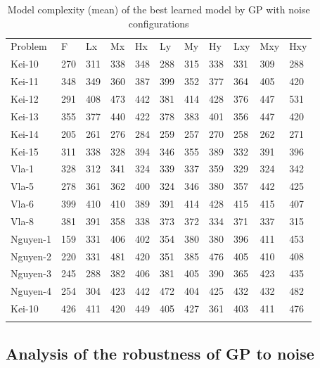 \begin{center}
\begin{table}
\caption{Model complexity (mean) of the best learned model by GP with noise configurations}
\label{tab:size}       %
\begin{tabular}{lllllllllll}
\hline\noalign{\smallskip}
Problem & F & Lx & Mx & Hx & Ly & My & Hy & Lxy & Mxy & Hxy  \\
\noalign{\smallskip}\hline\noalign{\smallskip}
Kei-10 & 270 & 311 & 338 & 348 & 288 & 315	& 338 &	331	& 309 & 288 \\
Kei-11 & 348 & 349 & 360 & 387 & 399 & 352 & 377 & 364 & 405 & 420 \\
Kei-12 & 291 & 408 & 473 & 442 & 381 & 414 & 428 & 376 & 447 & 531 \\
Kei-13 & 355 & 377 & 440 & 422 & 378 & 383 & 401 & 356 & 447 & 420 \\
Kei-14 & 205 & 261 & 276 & 284 & 259 & 257 & 270 & 258 & 262 & 271 \\
Kei-15 & 311 & 338 & 328 & 394 & 346 & 355 & 389 & 332 & 391 & 396 \\
Vla-1 & 328 & 312 & 341 & 324 & 339 & 337 & 359 & 329 & 324 & 342 \\
Vla-5 & 278 & 361 & 362 & 400 & 324 & 346 & 380 & 357 & 442 & 425 \\
Vla-6 & 399 & 410 & 410 & 389 & 391 & 414 & 428 & 415 & 415 & 407 \\
Vla-8 & 381 & 391 & 358 & 338 & 373 & 372 & 334 & 371 & 337 & 315 \\
Nguyen-1 & 159 & 331 & 406 & 402 & 354 & 380 & 380 & 396 & 411 & 453 \\
Nguyen-2 & 220 & 331 & 481 & 420 & 351 & 385 & 476 & 405 & 410 & 408 \\
Nguyen-3 & 245 & 288 & 382 & 406 & 381 & 405 & 390 & 365 & 423 & 435 \\
Nguyen-4 & 254 & 304 & 423 & 442 & 472 & 404 & 425 & 432 & 432 & 482 \\
Kei-10 & 426 & 411 & 420 & 449 & 405 & 427 & 361 & 403 & 411 & 476 \\
\noalign{\smallskip}\hline
\end{tabular}
\end{table}
\end{center}

\subsection {Analysis of the robustness of GP to noise}
\label{AnaFittest}


